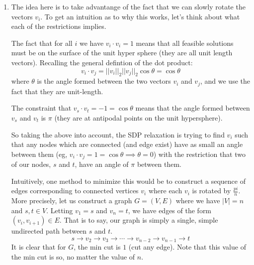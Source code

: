 \documentclass[12pt]{exam}
\begin{document}
\begin{questions}
\begin{solution}
\begin{enumerate}[label=(\alph*)]
\begin{proof}
\begin{itemize}
        \item Whenever $z_v \neq 0$, the corresponding constraint is satisfied with equality. This is trivially satisfied by what we showed in (a). As such, we focus instead in the case when $\ell_e \neq 0$. By our definition of $f_e$, this corresponding constraint is also trivially satisfied.
      \end{itemize}

      As such, our new solution to the dual constructed from the s-t derived from the fixed value of $r$ satisfies the complementary slackness conditions. This implies that it is an optimal solution, which means that the s-t cut is a min cut.
    \end{proof} 
  \item
    The idea here is to take advantange of the fact that we can slowly rotate the vectors $v_i$. To get an intuition as to why this works, let's think about what each of the restrictions implies.

    The fact that for all $i$ we have $v_i \cdot v_i = 1$ means that all feasible solutions must be on the surface of the unit hyper sphere (they are all unit length vectors). Recalling the general defintion of the dot product:
    \[
      v_i \cdot v_j = ||v_i||_2 ||v_j||_2 \cos \theta = \cos \theta 
    \]
    where $\theta$ is the angle formed between the two vectors $v_i$ and $v_j$, and we use the fact that they are unit-length. 

    The constraint that $v_s \cdot v_t = -1 = \cos \theta$ means that the angle formed between $v_s$ and $v_t$ is $\pi$ (they are at antipodal points on the unit hypersphere). 

    So taking the above into account, the SDP relaxation is trying to find $v_i$ such that any nodes which are connected (and edge exist) have as small an angle between them (eg, $v_i \cdot v_j = 1 = \cos \theta \implies \theta = 0$) with the restriction that two of our nodes, $s$ and $t$, have an angle of $\pi$ between them.

    Intuitively, one method to minimize this would be to construct a sequence of edges corresponding to connected vertices $v_i$ where each $v_i$ is rotated by $\frac{pi}{n}$. More precisely, let us construct a graph $G = (V, E)$ where we have $|V| = n$ and $s,t \in V$. Letting $v_1 = s$ and $v_n = t$, we have edges of the form $(v_i, v_{i+1}) \in E$. That is to say, our graph is simply a single, simple undirected path between $s$ and $t$.
    \[
      s \to v_2 \to v_3 \to \cdots \to v_{n-2} \to v_{n-1} \to t
    \]
    It is clear that for $G$, the min cut is $1$ (cut any edge). Note that this value of the min cut is so, no matter the value of $n$.


\end{enumerate}
\end{solution}
\end{questions}
\end{document}
